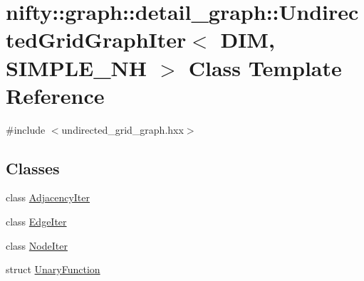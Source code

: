 \hypertarget{classnifty_1_1graph_1_1detail__graph_1_1UndirectedGridGraphIter}{}\section{nifty\+:\+:graph\+:\+:detail\+\_\+graph\+:\+:Undirected\+Grid\+Graph\+Iter$<$ D\+I\+M, S\+I\+M\+P\+L\+E\+\_\+\+N\+H $>$ Class Template Reference}
\label{classnifty_1_1graph_1_1detail__graph_1_1UndirectedGridGraphIter}


{\ttfamily \#include $<$undirected\+\_\+grid\+\_\+graph.\+hxx$>$}

\subsection*{Classes}
\begin{DoxyCompactItemize}
\item 
class \hyperlink{classnifty_1_1graph_1_1detail__graph_1_1UndirectedGridGraphIter_1_1AdjacencyIter}{Adjacency\+Iter}
\item 
class \hyperlink{classnifty_1_1graph_1_1detail__graph_1_1UndirectedGridGraphIter_1_1EdgeIter}{Edge\+Iter}
\item 
class \hyperlink{classnifty_1_1graph_1_1detail__graph_1_1UndirectedGridGraphIter_1_1NodeIter}{Node\+Iter}
\item 
struct \hyperlink{structnifty_1_1graph_1_1detail__graph_1_1UndirectedGridGraphIter_1_1UnaryFunction}{Unary\+Function}
\end{DoxyCompactItemize}
